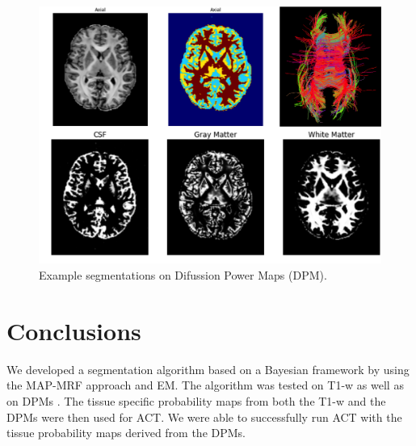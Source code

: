 \documentclass[twocolumn]{bmcart}%
\begin{document}
\begin{figure}[h!]
  \includegraphics[width=.46\textwidth]{Power_map_fig.png}
  \caption{\label{centfig} Example segmentations on Difussion Power Maps (DPM).}
\end{figure}

\section{Conclusions}\label{conclusions}

We developed a segmentation algorithm based on a Bayesian framework by
using the MAP-MRF approach and EM. The algorithm was tested on
T1-w as well as on DPMs \cite{Dell2014}. The tissue specific
probability maps from both the T1-w and the DPMs were then used for ACT. We were able to successfully run ACT with the tissue probability maps derived from the DPMs.

\end{document}
